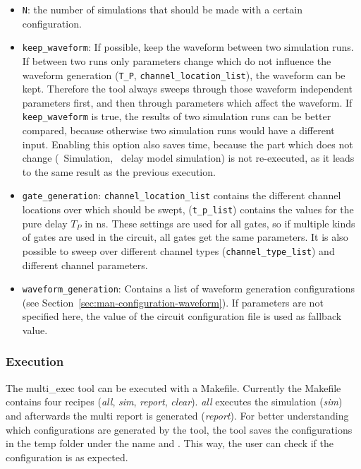 \begin{itemize}
\item
  \lstinline|N|: the number of simulations that should be made with a certain
  configuration.
\item
  \lstinline|keep_waveform|: If possible, keep the waveform between two 
  simulation runs. If between two runs only parameters change which do not
  influence the waveform generation (\lstinline|T_P|, 
  \lstinline|channel_location_list|), the
  waveform can be kept. Therefore the tool always sweeps through those
  waveform independent parameters first, and then through parameters
  which affect the waveform. If \lstinline|keep_waveform| is true, the results 
  of  two simulation runs can be better compared, because otherwise two
  simulation runs would have a different input. Enabling this option
  also saves time, because the part which does not change (\spice\
  Simulation, \modelsim\ delay model simulation) is not re-executed, as it leads
  to the same result as the previous execution.
\item
  \lstinline|gate_generation|: \lstinline|channel_location_list| contains the 
  different channel locations over which should be swept,   
  (\lstinline|t_p_list|) contains the values for the pure delay $T_P$ in 
  \si{ns}.
  These settings are used for all gates, so if multiple kinds 
  of gates are used in the circuit, all gates get the same parameters. It is 
  also possible to sweep over different channel types   
  (\lstinline|channel_type_list|) and different channel parameters.
\item
  \lstinline|waveform_generation|: Contains a list of waveform generation
  configurations (see Section~\ref{sec:man-configuration-waveform}).
  If parameters are not specified here, the value of the circuit
  configuration file is used as fallback value.
\end{itemize}

\subsubsection{Execution}\label{sec:man-multi-execution}

The multi\_exec tool can be executed with a Makefile. Currently the
Makefile contains four recipes (\emph{all}, \emph{sim}, \emph{report},
\emph{clear}). \emph{all} executes the simulation (\emph{sim}) and
afterwards the multi report is generated (\emph{report}). For better
understanding which configurations are generated by the tool, the tool
saves the configurations in the temp folder under the name
 and . This 
way, the user can check if the configuration is as expected.

